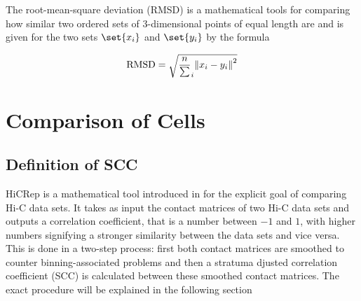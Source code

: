 \documentclass[a4paper,11pt,oneside,final,english,toc=bib,draft]{scrbook}
\begin{document}
The root-mean-square deviation (RMSD) is a mathematical tools for comparing how similar two ordered sets of 3-dimensional points of equal length are and is given for the two sets \( \set{x_i} \) and \( \set{y_i} \) by the formula

\[
  \text{RMSD} = \sqrt{ \frac{n} \sum_i \norm{x_i - y_i}^2 }
\]




















\chapter{Comparison of Cells} %
\label{cha:comparison_of_cells}

\section{Definition of SCC} %
\label{sec:definition_of_scc}

HiCRep is a mathematical tool introduced in \cite{yang_hicrep_2017} for the explicit goal of comparing Hi-C data sets. It takes as input the contact matrices of two Hi-C data sets and outputs a correlation coefficient, that is a number between \(-1\) and \(1\), with higher numbers signifying a stronger similarity between the data sets and vice versa. This is done in a two-step process: first both contact matrices are smoothed to counter binning-associated problems and then a stratuma djusted correlation coefficient (SCC) is calculated between these smoothed contact matrices. The exact procedure will be explained in the following section
\end{document}
